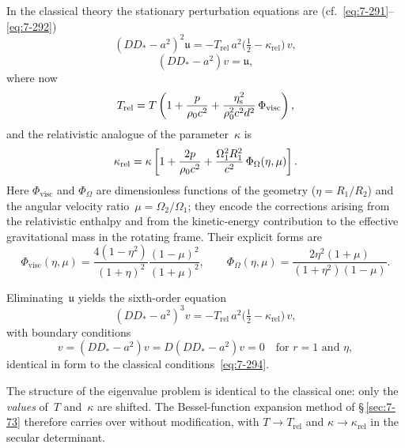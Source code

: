 In the classical theory the stationary perturbation equations are
(cf.~\eqref{eq:7-291}--\eqref{eq:7-292})
\begin{equation}
\label{eq:rel-7-291}
(DD_{*}-a^{2})^{2}\mathfrak{u}
= -T_{\mathrm{rel}}\,a^{2}\bigl(\tfrac{1}{2}-\kappa_{\mathrm{rel}}\bigr)\,v,
\end{equation}
\begin{equation}
\label{eq:rel-7-292}
(DD_{*}-a^{2})v = \mathfrak{u},
\end{equation}
where now
\begin{equation}
\label{eq:rel-7-293}
T_{\mathrm{rel}}
= T\left(1 + \frac{p}{\rho_0 c^{2}}
         + \frac{\eta_{\mathrm{s}}^{2}}{\rho_0^{2}c^{2}d^{2}}\,\Phi_{\mathrm{visc}}
    \right),
\end{equation}
and the relativistic analogue of the parameter~$\kappa$ is
\begin{equation}
\label{eq:rel-7-294}
\kappa_{\mathrm{rel}}
= \kappa\left[
  1 + \frac{2p}{\rho_0 c^{2}}
    + \frac{\Omega_{1}^{2}R_{1}^{2}}{c^{2}}\,\Phi_{\Omega}(\eta,\mu)
  \right].
\end{equation}
Here $\Phi_{\mathrm{visc}}$ and $\Phi_{\Omega}$ are dimensionless
functions of the geometry ($\eta = R_{1}/R_{2}$) and the angular
velocity ratio~$\mu = \Omega_{2}/\Omega_{1}$; they encode the
corrections arising from the relativistic enthalpy and from the
kinetic-energy contribution to the effective gravitational mass in the
rotating frame.  Their explicit forms are
\begin{equation}
\label{eq:rel-7-295}
\Phi_{\mathrm{visc}}(\eta,\mu)
= \frac{4(1-\eta^{2})}{(1+\eta)^{2}}
  \frac{(1-\mu)^{2}}{(1+\mu)^{2}},
\qquad
\Phi_{\Omega}(\eta,\mu)
= \frac{2\eta^{2}(1+\mu)}{(1+\eta^{2})(1-\mu)}.
\end{equation}

Eliminating~$\mathfrak{u}$ yields the sixth-order equation
\begin{equation}
\label{eq:rel-7-296}
(DD_{*}-a^{2})^{3}v
= -T_{\mathrm{rel}}\,a^{2}\bigl(\tfrac{1}{2}-\kappa_{\mathrm{rel}}\bigr)\,v,
\end{equation}
with boundary conditions
\begin{equation}
\label{eq:rel-7-297}
v = (DD_{*}-a^{2})v = D(DD_{*}-a^{2})v = 0
\quad\text{for } r = 1 \text{ and } \eta,
\end{equation}
identical in form to the classical conditions~\eqref{eq:7-294}.

\begin{relcorrection}
The structure of the eigenvalue problem is identical to the classical
one: only the \emph{values} of~$T$ and~$\kappa$ are shifted.  The
Bessel-function expansion method of \S\,\ref{sec:7-73} therefore
carries over without modification, with $T\to T_{\mathrm{rel}}$ and
$\kappa\to\kappa_{\mathrm{rel}}$ in the secular determinant.
\end{relcorrection}

